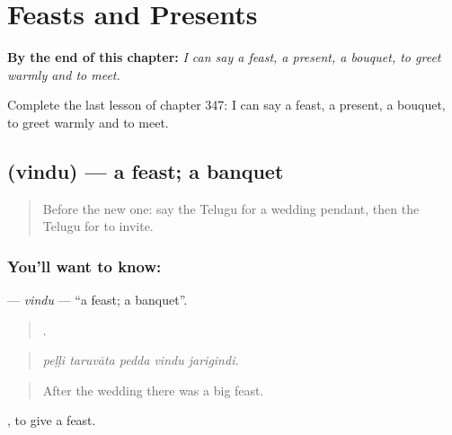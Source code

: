 
\chapter{Feasts and Presents}
\label{ch:te-feasts-and-presents}

\begin{chapteropening}
\textbf{By the end of this chapter:} \emph{I can say a feast, a present, a bouquet, to greet warmly and to meet.}

Complete the last lesson of chapter 347: I can say a feast, a present, a bouquet, to greet warmly and to meet.
\end{chapteropening}

\section[\texorpdfstring{\te{విందు} (vindu)}{విందు (vindu)}]{ (vindu) — a feast; a banquet}

\label{lesson:TE-C347-vindu}



\begin{quote}
Before the new one: say the Telugu for a wedding pendant, then the Telugu for to invite.
\end{quote}

\subsection*{You'll want to know: }
\textbf{} — \emph{vindu} — \textquotedblleft{}a feast; a banquet\textquotedblright{}.

\begin{quote}
    .
\end{quote}

\begin{quote}
\emph{peḷḷi taruvāta pedda vindu jarigindi.}
\end{quote}

\begin{quote}
After the wedding there was a big feast.
\end{quote}

 , to give a feast.

